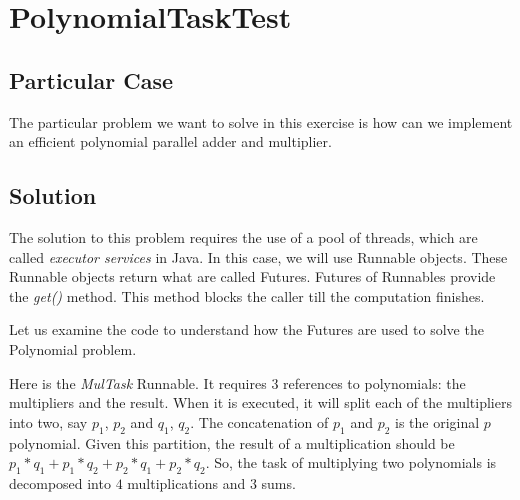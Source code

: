 \section{\textbf{PolynomialTaskTest}}
\subsection{Particular Case}
\par
The particular problem we want to solve in this exercise is how can we implement
an efficient polynomial parallel adder and multiplier.
\par
\subsection{Solution}
\par
The solution to this problem requires the use of a pool of threads, which are
called \textit{executor services} in Java.  In this case, we will use Runnable
objects. These Runnable objects return what are called Futures. Futures of
Runnables provide the \textit{get()} method. This method blocks the caller till
the computation finishes. 
\par
Let us examine the code to understand how the Futures are used to solve the
Polynomial problem.
\par
Here is the \textit{MulTask} Runnable. It requires 3 references to polynomials:
the multipliers and the result. When it is executed, it will split each of the
multipliers into two, say $p_1$, $p_2$ and $q_1$, $q_2$. The concatenation of
$p_1$ and $p_2$ is the original $p$ polynomial. Given this partition, the result
of a multiplication should be $p_1*q_1 + p_1*q_2 + p_2*q_1 + p_2*q_2$. So, the
task of multiplying two polynomials is decomposed into $4$ multiplications and
$3$ sums. 
\par
\hfill
